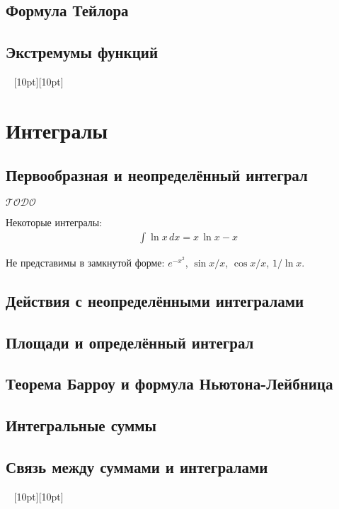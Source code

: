 \documentclass[a4paper,12pt]{article}
\numberwithin{figure}{section}
\theoremstyle{definition}
\def\todo{\guillemotleft$\mathcal{TODO}$\guillemotright\textellipsis}
\def\vignette{\vspace{48pt} \noindent \hrulefill~ \raisebox{-8pt}[10pt][10pt]{\Huge\ding{102}}~ \hrulefill}
\begin{document}
\subsection{Формула Тейлора}


\subsection{Экстремумы функций}




\vignette
\section{Интегралы}


\subsection{Первообразная и неопределённый интеграл}

\todo

Некоторые интегралы:
\begin{align*}
&	\int \ln x \, dx = x \, \ln x - x
\end{align*}

Не представимы в замкнутой форме: $e^{-x^2}$, $\sin x/x$, $\cos x/x$, $1/\ln x$.


\subsection{Действия с неопределёнными интегралами}


\subsection{Площади и определённый интеграл}


\subsection{Теорема Барроу и формула Ньютона-Лейбница}


\subsection{Интегральные суммы}


\subsection{Связь между суммами и интегралами}

\vignette
\end{document}
